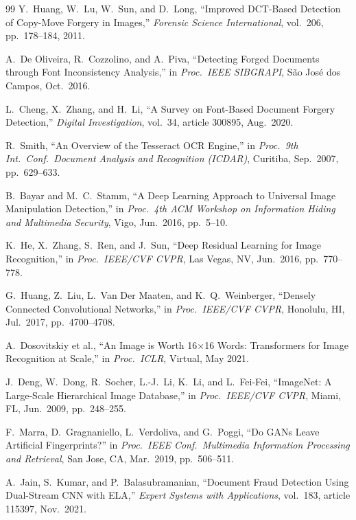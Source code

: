 \documentclass[12pt,a4paper,oneside]{report}
\begin{document}
\begin{thebibliography}{99}
Y.~Huang, W.~Lu, W.~Sun, and D.~Long,
``Improved DCT-Based Detection of Copy-Move Forgery in Images,''
\textit{Forensic Science International}, vol.~206, pp.~178--184, 2011.

A.~De Oliveira, R.~Cozzolino, and A.~Piva,
``Detecting Forged Documents through Font Inconsistency Analysis,''
in \textit{Proc.\ IEEE SIBGRAPI}, S\~{a}o Jos\'{e} dos Campos, Oct.\ 2016.

L.~Cheng, X.~Zhang, and H.~Li,
``A Survey on Font-Based Document Forgery Detection,''
\textit{Digital Investigation}, vol.~34, article 300895, Aug.\ 2020.

R.~Smith,
``An Overview of the Tesseract OCR Engine,''
in \textit{Proc.\ 9th Int.\ Conf.\ Document Analysis and Recognition (ICDAR)},
Curitiba, Sep.\ 2007, pp.~629--633.

B.~Bayar and M.~C.~Stamm,
``A Deep Learning Approach to Universal Image Manipulation Detection,''
in \textit{Proc.\ 4th ACM Workshop on Information Hiding and Multimedia Security},
Vigo, Jun.\ 2016, pp.~5--10.

K.~He, X.~Zhang, S.~Ren, and J.~Sun,
``Deep Residual Learning for Image Recognition,''
in \textit{Proc.\ IEEE/CVF CVPR}, Las Vegas, NV, Jun.\ 2016, pp.~770--778.

G.~Huang, Z.~Liu, L.~Van Der Maaten, and K.~Q.~Weinberger,
``Densely Connected Convolutional Networks,''
in \textit{Proc.\ IEEE/CVF CVPR}, Honolulu, HI, Jul.\ 2017, pp.~4700--4708.

A.~Dosovitskiy et al.,
``An Image is Worth 16$\times$16 Words: Transformers for Image Recognition at Scale,''
in \textit{Proc.\ ICLR}, Virtual, May 2021.

J.~Deng, W.~Dong, R.~Socher, L.-J.~Li, K.~Li, and L.~Fei-Fei,
``ImageNet: A Large-Scale Hierarchical Image Database,''
in \textit{Proc.\ IEEE/CVF CVPR}, Miami, FL, Jun.\ 2009, pp.~248--255.

F.~Marra, D.~Gragnaniello, L.~Verdoliva, and G.~Poggi,
``Do GANs Leave Artificial Fingerprints?''
in \textit{Proc.\ IEEE Conf.\ Multimedia Information Processing and Retrieval},
San Jose, CA, Mar.\ 2019, pp.~506--511.

A.~Jain, S.~Kumar, and P.~Balasubramanian,
``Document Fraud Detection Using Dual-Stream CNN with ELA,''
\textit{Expert Systems with Applications}, vol.~183, article 115397, Nov.\ 2021.


\end{thebibliography}
\end{document}
